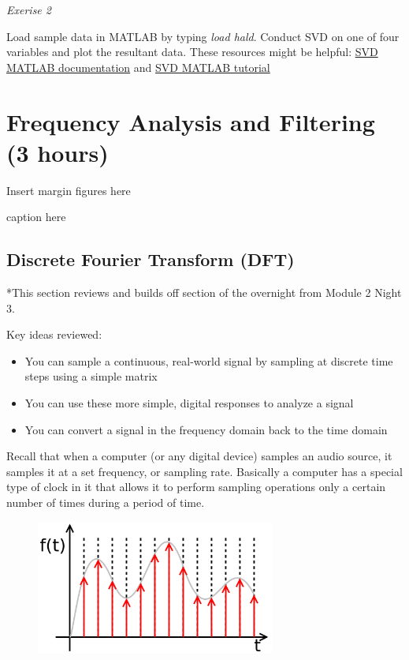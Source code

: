 \documentclass{tufte-handout}
\begin{document}
\textit{Exerise 2}

Load sample data in MATLAB by typing \textit{load hald}. Conduct SVD on one of four variables and plot the resultant data. These resources might be helpful: \href{https://www.mathworks.com/help/matlab/ref/svd.html}{SVD MATLAB documentation} and \href{http://www.matrixlab-examples.com/singular-value-decomposition.html}{SVD MATLAB tutorial}




\section{Frequency Analysis and Filtering (3 hours)}

\begin{marginfigure}
Insert margin figures here
\caption{caption here}
\end{marginfigure}

\subsection{Discrete Fourier Transform (DFT)}
*This section reviews and builds off section of the overnight from Module 2 Night 3.

Key ideas reviewed:
\begin{itemize}
	\item You can sample a continuous, real-world signal by sampling at discrete time steps using a simple matrix
	\item You can use these more simple, digital responses to analyze a signal
	\item You can convert a signal in the frequency domain back to the time domain
\end{itemize}

Recall that when a computer (or any digital device) samples an audio source, it samples it at a set frequency, or sampling rate. Basically a computer has a special type of clock in it that allows it to perform sampling operations only a certain number of times during a period of time. 

\begin{figure}
	\centering 
	\includegraphics[width=0.7\textwidth]{discrete_time.png}
	\caption{}
	\label{fig:discrete_time}
\end{figure}
\end{document}
